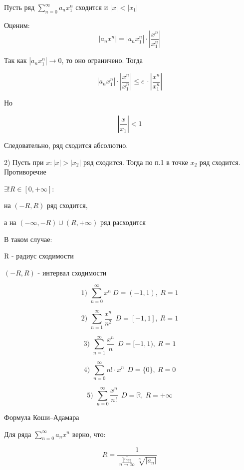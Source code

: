 \documentclass[12pt,a4paper]{article}
\begin{document}
\begin{proofbox}{}
    Пусть ряд $\sum_{n=0}^\infty a_n x_1^n$ сходится и $|x|<|x_1|$

    Оценим:
    \[
        |a_n x^n| = |a_n x_1^n| \cdot \left| \frac{x^n}{x_1^n} \right|
    \]

    Так как $|a_n x_1^n| \longrightarrow 0$, то оно ограничено. Тогда

    \[
        |a_n x_1^n| \cdot \left| \frac{x^n}{x_1^n} \right|
        \leq c \ \cdot \left| \frac{x^n}{x_1^n} \right|
    \]

    Но

    \[
        \left| \frac{x}{x_1} \right| < 1
    \]

    Следовательно, ряд сходится абсолютно.

    2) Пусть при $x: |x|>|x_2|$ ряд сходится. Тогда по п.1 в точке $x_2$ ряд сходится. Противоречие
\end{proofbox}

\begin{corollary}
    $\exists! R \in [0, +\infty]: $

    на $(-R, R)$ ряд сходится,

    а на $(-\infty, -R)\cup(R, +\infty)$ ряд расходится

    В таком случае:

    R - радиус сходимости

    $(-R, R)$ - интервал сходимости

\end{corollary}

\begin{example}
    \[
        \text{1) } \sum_{n=0}^\infty x^n \ D = (-1, 1), \ R = 1
    \]

    \[
        \text{2) }\sum_{n=1}^\infty \frac{x^n}{n^2} \ \ D = [-1, 1], \ R = 1
    \]

    \[
        \text{3) }\sum_{n=1}^\infty \frac{x^n}{n} \ \ D = [-1, 1), \ R = 1
    \]

    \[
        \text{4) }\sum_{n=0}^\infty n! \cdot x^n \ \ D = \{0\}, \ R = 0
    \]

    \[
        \text{5) }\sum_{n=0}^\infty \frac{x^n}{n!} \ \ D = \mathbb{R}, \ R = +\infty
    \]

\end{example}

\begin{theorem}{Формула Коши--Адамара}

    Для ряда $\sum_{n=0}^\infty a_nx^n$ верно, что:

    \[
        R = \frac{1}{\overline{\lim_{n\to\infty}}\sqrt[n]{|a_n|}}
    \]

\end{theorem}
\end{document}
